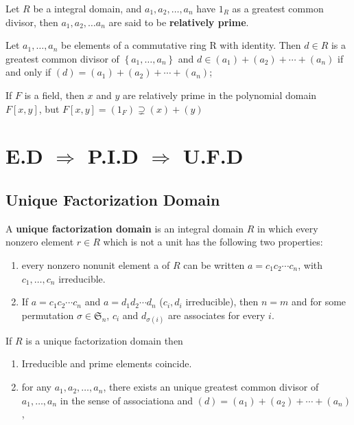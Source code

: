 \begin{definition}
    Let $R$ be a integral domain, and $a_1, a_2, \ldots, a_n$ have $1_R$ as a greatest common divisor, then $a_1, a_2, \ldots a_n$ are said to be \textbf{relatively prime}.
\end{definition}
\begin{theorem}
    Let $a_1, \ldots, a_{n}$ be elements of a commutative ring R with identity. Then
    $d \in R$ is a greatest common divisor of $\left\{a_1, \ldots, a_{n}\right\}$ and $d\in \left(a_1\right)+\left(a_2\right)+\cdots+\left(a_{n}\right)$ if and only if $(d)=\left(a_1\right)+\left(a_2\right)+\cdots+\left(a_{n}\right)$;


    If $F$ is a field, then $x$ and $y$ are relatively prime in the polynomial domain $F[x, y]$, but $F[x, y]=\left(1_F\right) \supsetneq (x)+(y)$
\end{theorem}


\section{E.D $\Rightarrow$ P.I.D $\Rightarrow$ U.F.D}

\subsection{Unique Factorization Domain}
\begin{definition}
    A \textbf{unique factorization domain} is an integral domain $R$ in which every nonzero element $r \in R$ which is not a unit has the following two properties:

    \begin{enumerate}[label=(\roman*)]
        \item
              every nonzero nonunit element a of $R$ can be written $a=c_1 c_2 \cdots c_{n}$, with $c_1, \ldots, c_{n}$ irreducible.
        \item
              If $a=c_1 c_2 \cdots c_{n}$ and $a=d_1 d_2 \cdots d_{n}$ ($c_{i}, d_{i}$ irreducible), then $n=m$ and for some permutation $\sigma\in \mathfrak{S}_n$,
              $c_{i}$ and $d_{\sigma(i)}$ are associates for every $i$.
    \end{enumerate}
\end{definition}
\begin{proposition}
    \label{pro: unique factorization domain}
    If $R$ is a unique factorization domain then
    \begin{enumerate}
        \item
              Irreducible and prime elements coincide.
        \item
              for any $a_1,a_2,\ldots,a_n$, there exists an unique greatest common divisor of $a_1, \ldots, a_{n}$ in the sense of associationa and $\left(d\right)=\left(a_1\right)+\left(a_2\right)+\cdots+\left(a_n\right)$
              ,
    \end{enumerate}
\end{proposition}


